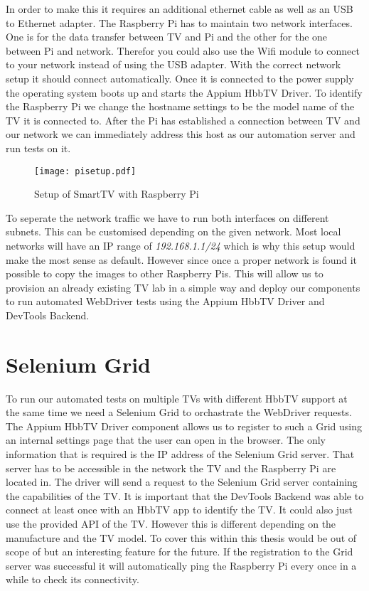 In order to make this it requires an additional ethernet cable as well as an USB to Ethernet adapter.
The Raspberry Pi has to maintain two network interfaces. One is for the data transfer between TV
and Pi and the other for the one between Pi and network. Therefor you could also use the Wifi module
to connect to your network instead of using the USB adapter. With the correct network setup it should
connect automatically. Once it is connected to the power supply the operating system boots up and
starts the Appium HbbTV Driver. To identify the Raspberry Pi we change the hostname settings to be
the model name of the TV it is connected to. After the Pi has established a connection between TV
and our network we can immediately address this host as our automation server and run tests on it.

\vspace{1cm}
\begin{figure}[htb]
  \centering
  \texttt{[image: pisetup.pdf]}\\
  \caption{Setup of SmartTV with Raspberry Pi}\label{fig:pisetup}
\end{figure}
\vspace{0.5cm}

To seperate the network traffic we have to run both interfaces on different subnets. This can be
customised depending on the given network. Most local networks will have an IP range of
\textit{192.168.1.1/24} which is why this setup would make the most sense as default. However since
once a proper network is found it possible to copy the images to other Raspberry Pis. This will
allow us to provision an already existing TV lab in a simple way and deploy our components to run
automated WebDriver tests using the Appium HbbTV Driver and DevTools Backend.

\section{Selenium Grid\label{sec:grid}}

To run our automated tests on multiple TVs with different HbbTV support at the same time we need
a Selenium Grid to orchastrate the WebDriver requests. The Appium HbbTV Driver component allows us
to register to such a Grid using an internal settings page that the user can open in the browser.
The only information that is required is the IP address of the Selenium Grid server. That server
has to be accessible in the network the TV and the Raspberry Pi are located in. The driver will send
a request to the Selenium Grid server containing the capabilities of the TV. It is important that
the DevTools Backend was able to connect at least once with an HbbTV app to identify the TV. It
could also just use the provided API of the TV. However this is different depending on the manufacture
and the TV model. To cover this within this thesis would be out of scope of but an interesting
feature for the future. If the registration to the Grid server was successful it will automatically
ping the Raspberry Pi every once in a while to check its connectivity.

